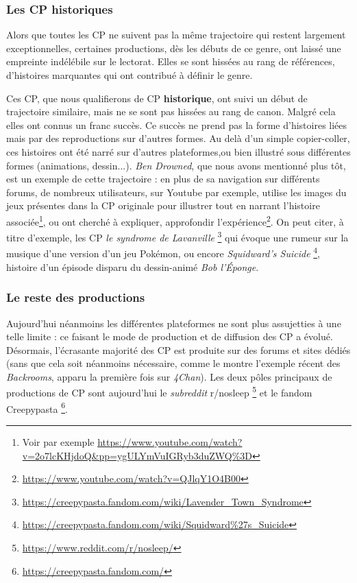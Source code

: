 \documentclass[12pt,a4paper,oneside,titlepage]{book} %
\begin{document}
	\subsubsection{Les CP historiques}
	
	Alors que toutes les CP ne suivent pas la même trajectoire qui restent largement exceptionnelles, certaines productions, dès les débuts de ce genre, ont laissé une empreinte indélébile sur le lectorat. Elles se sont hissées au rang de références, d'histoires marquantes qui ont contribué à définir le genre. 
	
	Ces CP, que nous qualifierons de CP \textbf{historique}, ont suivi un début de trajectoire similaire, mais ne se sont pas hissées au rang de canon. Malgré cela elles ont connus un franc succès. Ce succès ne prend pas la forme d'histoires liées mais par des reproductions sur d'autres formes. Au delà d'un simple copier-coller, ces histoires ont été narré sur d'autres plateformes,ou bien illustré sous différentes formes (animations, dessin...). 
	\textit{Ben Drowned}, que nous avons mentionné plus tôt, est un exemple de cette trajectoire : en plus de sa navigation sur différents forums, de nombreux utilisateurs, sur Youtube par exemple, utilise les images du jeux présentes dans la CP originale pour illustrer tout en narrant l'histoire associée\footnote{Voir par exemple \url{https://www.youtube.com/watch?v=2o7lcKHjdoQ\&pp=ygULYmVuIGRyb3duZWQ\%3D}}, ou ont cherché à expliquer, approfondir l'expérience\footnote{\url{https://www.youtube.com/watch?v=QJlqY1O4B00}}.
	On peut citer, à titre d'exemple, les CP \emph{le syndrome de Lavanville} \footnote{\url{https://creepypasta.fandom.com/wiki/Lavender_Town_Syndrome}} qui évoque une rumeur sur la musique d'une version d'un jeu Pokémon, ou encore \emph{Squidward's Suicide} \footnote{\url{https://creepypasta.fandom.com/wiki/Squidward\%27s_Suicide}}, histoire d'un épisode disparu du dessin-animé \emph{Bob l'Éponge}.

	\subsubsection{Le reste des productions}
	
	Aujourd’hui néanmoins les différentes plateformes ne sont plus assujetties à une telle limite : ce faisant le mode de production et de diffusion des CP a évolué.
	Désormais, l’écrasante majorité des CP est produite sur des forums et sites dédiés (sans que cela soit néanmoins nécessaire, comme le montre l'exemple récent des \emph{Backrooms}, apparu la première fois sur \emph{4Chan}). Les deux pôles principaux de productions de CP sont aujourd'hui le \emph{subreddit} r/nosleep \footnote{\url{https://www.reddit.com/r/nosleep/}} et le fandom Creepypasta \footnote{\url{https://creepypasta.fandom.com/}}. 
	
\end{document}
